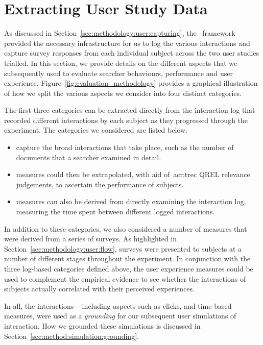 \section{Extracting User Study Data}\label{sec:methodology:extracting}
As discussed in Section~\ref{sec:methodology:user:capturing}, the \treconomics~framework provided the necessary infrastructure for us to log the various interactions and capture survey responses from each individual subject across the two user studies trialled. In this section, we provide details on the different aspects that we subsequently used to evaluate searcher behaviours, performance and user experience. Figure~\ref{fig:evaluation_methodology} provides a graphical illustration of how we split the various aspects we consider into four distinct categories.

The first three categories can be extracted directly from the interaction log that recorded different interactions by each subject as they progressed through the experiment. The categories we considered are listed below.

\begin{itemize}
    
    \item{ capture the broad interactions that take place, such as the number of documents that a searcher examined in detail.}
    \item{ measures could then be extrapolated, with aid of~\gls{acr:trec} QREL relevance judgements, to ascertain the performance of subjects.}
    \item{ measures can also be derived from directly examining the interaction log, measuring the time spent between different logged interactions.}
    
\end{itemize}

In addition to these categories, we also considered a number of  measures that were derived from a series of surveys. As highlighted in Section~\ref{sec:methodology:user:flow}, surveys were presented to subjects at a number of different stages throughout the experiment. In conjunction with the three log-based categories defined above, the user experience measures could be used to complement the empirical evidence to see whether the interactions of subjects actually correlated with their perceived experiences.

In all, the interactions -- including aspects such as clicks, and time-based measures, were used as a \emph{grounding} for our subsequent user simulations of interaction. How we grounded these simulations is discussed in Section~\ref{sec:method:simulation:grounding}.

